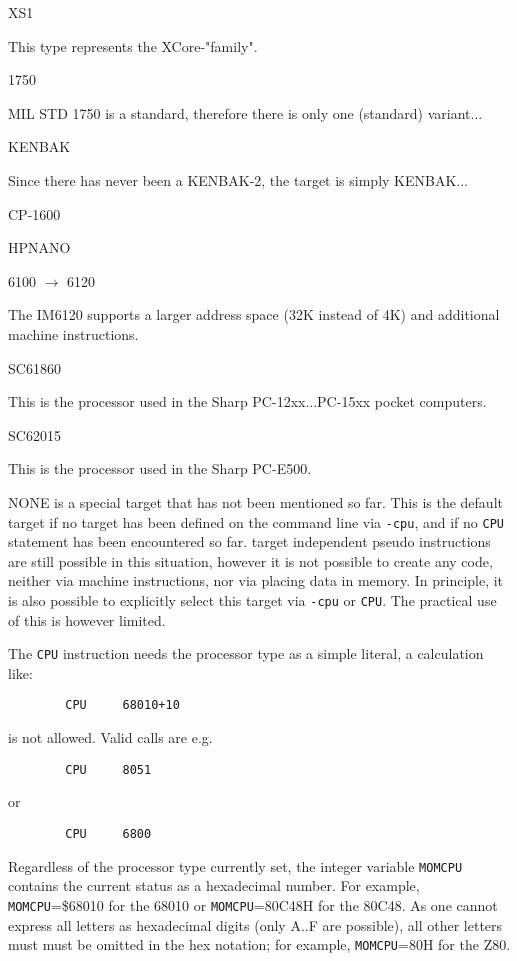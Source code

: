 \documentclass[12pt,twoside]{report}
\newcommand{\tty}[1]{{\tt #1}}
\begin{document}
\begin{cpulist}
   XS1
\end{cpulist}
This type represents the XCore-"family".
\begin{cpulist}
   1750
\end{cpulist}
MIL STD 1750 is a standard, therefore there is only one
(standard) variant...
\begin{cpulist}
   KENBAK
\end{cpulist}
Since there has never been a KENBAK-2, the target is simply KENBAK...
\begin{cpulist}
   CP-1600
\end{cpulist}
\begin{cpulist}
   HPNANO
\end{cpulist}
\begin{cpulist}
   6100 $\rightarrow$ 6120
\end{cpulist}
The IM6120 supports a larger address space (32K
instead of 4K) and additional machine instructions.
\begin{cpulist}
   SC61860
\end{cpulist}
This is the processor used in the Sharp PC-12xx...PC-15xx pocket computers.
\begin{cpulist}
   SC62015
\end{cpulist}
This is the processor used in the  Sharp PC-E500.

NONE is a special target that has not been mentioned so far.  This is the
default target if no target has been defined on the command line via
{\tt -cpu}, and if no {\tt CPU} statement has been encountered so far.
target independent pseudo instructions are still possible in this situation,
however it is not possible to create any code, neither via machine
instructions, nor via placing data in memory.  In principle, it is
also possible to explicitly select this target via {\tt -cpu} or
{\tt CPU}.  The practical use of this is however limited.

The \tty{CPU} instruction needs the processor type as a simple literal, a
calculation like:
\begin{verbatim}
        CPU     68010+10
\end{verbatim}
is not allowed.  Valid calls are e.g.
\begin{verbatim}
        CPU     8051
\end{verbatim}
or
\begin{verbatim}
        CPU     6800
\end{verbatim}
Regardless of the processor type currently set, the integer variable
\tty{MOMCPU} contains the current status as a hexadecimal number.  For
example, \tty{MOMCPU}=\$68010 for the 68010 or \tty{MOMCPU}=80C48H for the
80C48.  As one cannot express all letters as hexadecimal digits (only A..F
are possible), all other letters must must be omitted in the hex notation;
for example, \tty{MOMCPU}=80H for the Z80.
\end{document}
